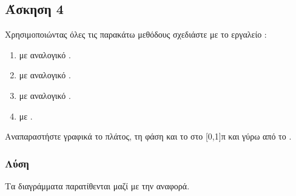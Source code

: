 \newpage\subsection*{Άσκηση 4}

Χρησιμοποιώντας όλες τις παρακάτω μεθόδους σχεδιάστε με το  εργαλείο :

\begin{enumerate}

    \item {} με αναλογικό .
    \item {} με αναλογικό .
    \item {} με αναλογικό .
    \item {} με .

\end{enumerate}

Αναπαραστήστε γραφικά το πλάτος, τη φάση και το  στο [0,1]π και γύρω από το .

\subsubsection*{Λύση}

Τα διαγράμματα παρατίθενται μαζί με την αναφορά.
